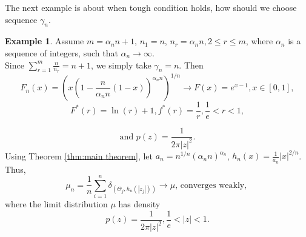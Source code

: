 \documentclass[12pt]{article}
\theoremstyle{plain}
\theoremstyle{definition}
\newtheorem{exm}{\textbf{Example}}
\theoremstyle{remark}
\begin{document}
The next example is about when tough condition holds, how should we choose sequence $\gamma_n$.
\begin{exm}
    Assume $m=\alpha_n n+1$, $n_{1}=n$, $n_r=\alpha_n n, 2\leq r \leq m$, where $\alpha_n$ is a sequence of integers, such that $\alpha_n\rightarrow \infty$.\\
    Since $\sum_{r=1}^{m} \frac{n}{n_{r}}=n+1$, we simply take $\gamma_n=n$. Then
    \begin{equation*}
    F_n(x)=(x(1-\frac{n}{\alpha_n n}(1-x))^{\alpha_n n})^{1/n}\rightarrow F(x)=e^{x-1}, x\in [0,1],
    \end{equation*}
    \begin{equation*}
    F^*(r)=\ln (r)+1, f^*(r)=\frac{1}{r}, \frac{1}{e}<r<1,
    \end{equation*}
\begin{center}
\end{center}
    \begin{equation*}
\text{and  }    p(z)=\frac{1}{2\pi |z|^2}.
    \end{equation*}
    Using Theorem \ref{thm:main theorem}, let $a_{n}=n^{1/n}(\alpha_n n)^{\alpha_n }$, $h_{n}(x)=\frac{1}{a_{n}}|x|^{2 / {n}}$.
    Thus,
    \begin{equation*}
    \mu_{n}=\frac{1}{n} \sum_{i=1}^{n} \delta_{\left(\Theta_{j}, h_{n}\left(\left|z_{j}\right|\right)\right)} \rightarrow \mu  \text {, converges weakly, }
    \end{equation*}
    where the limit distribution $\mu$ has density
    \begin{equation*}
   p(z)=\frac{1}{2\pi |z|^2}, \frac{1}{e}<|z|<1.
    \end{equation*}
\end{exm}
\end{document}
